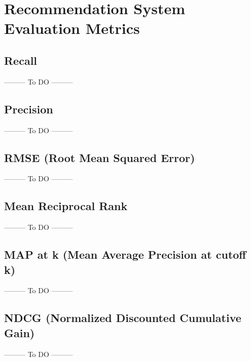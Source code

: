 
\section{Recommendation System Evaluation Metrics}

\subsection{Recall}
--------- To DO ---------
\subsection{Precision}
--------- To DO ---------
\subsection{RMSE (Root Mean Squared Error)}
--------- To DO ---------
\subsection{Mean Reciprocal Rank}
--------- To DO ---------
\subsection{MAP at k (Mean Average Precision at cutoff k)}
--------- To DO ---------
\subsection{NDCG (Normalized Discounted Cumulative Gain)}
--------- To DO ---------